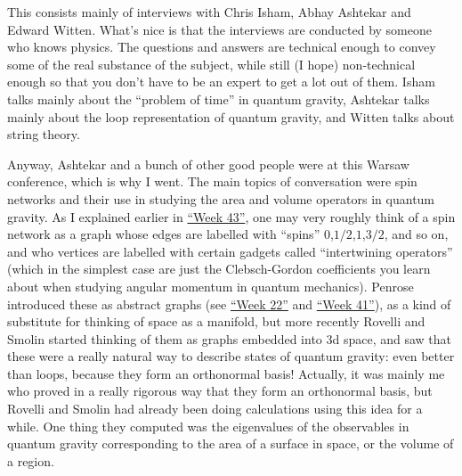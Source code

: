 \documentclass{article}
\def\tightlist{}
\renewcommand{\texttt}[1]{%
  \begingroup
  \ttfamily
  \begingroup\lccode`~=`/\lowercase{\endgroup\def~}{/\discretionary{}{}{}}%
  \begingroup\lccode`~=`[\lowercase{\endgroup\def~}{[\discretionary{}{}{}}%
  \begingroup\lccode`~=`.\lowercase{\endgroup\def~}{.\discretionary{}{}{}}%
  \catcode`/=\active\catcode`[=\active\catcode`.=\active
  \scantokens{#1\noexpand}%
  \endgroup
}
\begin{document}

This consists mainly of interviews with Chris Isham, Abhay Ashtekar and
Edward Witten. What's nice is that the interviews are conducted by
someone who knows physics. The questions and answers are technical
enough to convey some of the real substance of the subject, while still
(I hope) non-technical enough so that you don't have to be an expert to
get a lot out of them. Isham talks mainly about the ``problem of time''
in quantum gravity, Ashtekar talks mainly about the loop representation
of quantum gravity, and Witten talks about string theory.

Anyway, Ashtekar and a bunch of other good people were at this Warsaw
conference, which is why I went. The main topics of conversation were
spin networks and their use in studying the area and volume operators in
quantum gravity. As I explained earlier in
\protect\hyperlink{week43}{``Week 43''}, one may very roughly think of a
spin network as a graph whose edges are labelled with ``spins''
\(0\),\(1/2\),\(1\),\(3/2\), and so on, and who vertices are labelled
with certain gadgets called ``intertwining operators'' (which in the
simplest case are just the Clebsch-Gordon coefficients you learn about
when studying angular momentum in quantum mechanics). Penrose introduced
these as abstract graphs (see \protect\hyperlink{week22}{``Week 22''}
and \protect\hyperlink{week41}{``Week 41''}), as a kind of substitute
for thinking of space as a manifold, but more recently Rovelli and
Smolin started thinking of them as graphs embedded into 3d space, and
saw that these were a really natural way to describe states of quantum
gravity: even better than loops, because they form an orthonormal basis!
Actually, it was mainly me who proved in a really rigorous way that they
form an orthonormal basis, but Rovelli and Smolin had already been doing
calculations using this idea for a while. One thing they computed was
the eigenvalues of the observables in quantum gravity corresponding to
the area of a surface in space, or the volume of a region.
\end{document}
